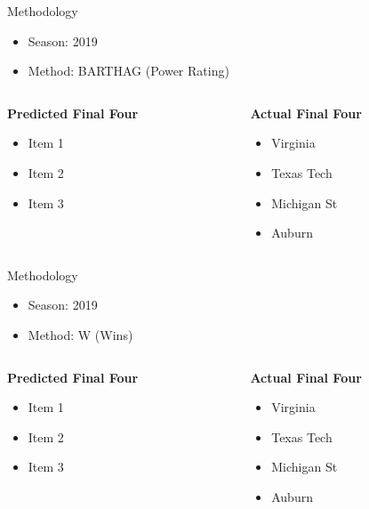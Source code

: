 \documentclass{beamer}
\begin{document}
\begin{frame}{Methodology}
\begin{itemize}
  \item Season: 2019
  \item Method: BARTHAG (Power Rating)
\end{itemize}

\begin{columns}[T] %
\begin{column}{0.5\textwidth} %
  \textbf{Predicted Final Four}
  \begin{itemize}
    \item Item 1
    \item Item 2
    \item Item 3
  \end{itemize}
\end{column}
\begin{column}{0.5\textwidth} %
  \textbf{Actual Final Four}
  \begin{itemize}
    \item Virginia
    \item Texas Tech
    \item Michigan St
    \item Auburn
  \end{itemize}
\end{column}
\end{columns}
\end{frame}

\begin{frame}{Methodology}
\begin{itemize}
  \item Season: 2019
  \item Method: W (Wins)
\end{itemize}

\begin{columns}[T] %
\begin{column}{0.5\textwidth} %
  \textbf{Predicted Final Four}
  \begin{itemize}
    \item Item 1
    \item Item 2
    \item Item 3
  \end{itemize}
\end{column}
\begin{column}{0.5\textwidth} %
  \textbf{Actual Final Four}
  \begin{itemize}
    \item Virginia
    \item Texas Tech
    \item Michigan St
    \item Auburn
  \end{itemize}
\end{column}
\end{columns}
\end{frame}
\end{document}
